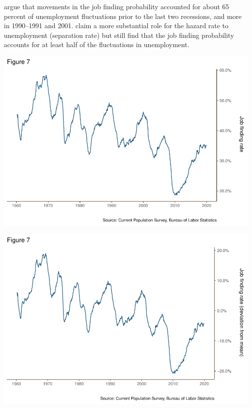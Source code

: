 \documentclass[
  11pt,
]{article}
\begin{document}
\cite{elsby09b} argue that movements in the job finding probability
accounted for about 65 percent of unemployment fluctuations prior to the
last two recessions, and more in 1990--1991 and 2001. \cite{fujita09}
claim a more substantial role for the hazard rate to unemployment
(separation rate) but still find that the job finding probability
accounts for at least half of the fluctuations in unemployment.

\begin{center}\includegraphics{JOLTS_files/figure-latex/unnamed-chunk-11-1} \end{center}

\begin{center}\includegraphics{JOLTS_files/figure-latex/unnamed-chunk-12-1} \end{center}
\end{document}

